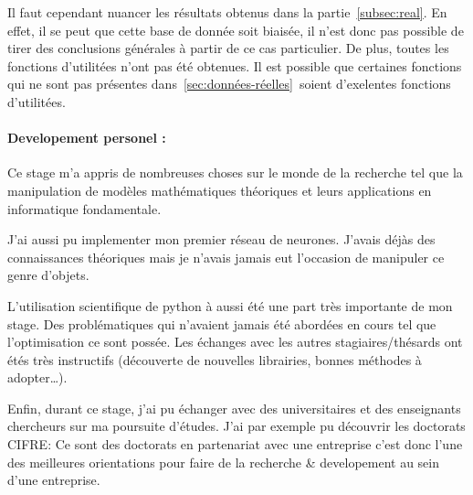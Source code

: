 
Il faut cependant nuancer les résultats obtenus dans la partie\ \ref{subsec:real}.
En effet, il se peut que cette base de donnée soit biaisée,
il n'est donc pas possible de tirer des conclusions générales à partir de ce cas particulier.
De plus, toutes les fonctions d'utilitées n'ont pas été obtenues.
Il est possible que certaines fonctions qui ne sont pas présentes dans\ \ref{sec:données-réelles}\
soient d'exelentes fonctions d'utilitées.


\paragraph{Developement personel :\\}
Ce stage m'a appris de nombreuses choses sur le monde de la recherche tel
que la manipulation de modèles mathématiques théoriques et leurs applications
en informatique fondamentale.


J'ai aussi pu implementer mon premier réseau de neurones.
J'avais déjàs des connaissances théoriques mais je
n'avais jamais eut l'occasion de manipuler ce genre d'objets.


L'utilisation scientifique de python à aussi été une part très importante de mon stage.
Des problématiques qui n'avaient jamais été abordées en cours tel que l'optimisation ce sont possée.
Les échanges avec les autres stagiaires/thésards ont étés très instructifs
(découverte de nouvelles librairies, bonnes méthodes à adopter\ldots).


Enfin, durant ce stage, j'ai pu échanger avec des universitaires et des enseignants chercheurs
sur ma poursuite d'études.
J'ai par exemple pu découvrir les doctorats \textsc{CIFRE}\cite{cifre}:
Ce sont des doctorats en partenariat avec une entreprise c'est donc l'une des meilleures
orientations pour faire de la recherche & developement au sein d'une entreprise.
